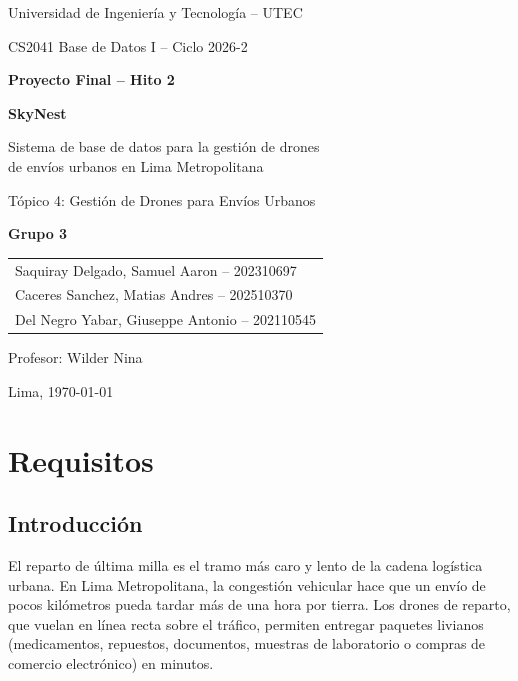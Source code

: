 \documentclass[11pt,a4paper]{article}
\begin{document}
\sloppy

\begin{titlepage}
\centering
{\large Universidad de Ingeniería y Tecnología -- UTEC\par}
\vspace{0.4cm}
{\large CS2041 Base de Datos I -- Ciclo 2026-2\par}
\vspace{2.5cm}
{\LARGE\bfseries Proyecto Final -- Hito 2\par}
\vspace{0.6cm}
{\Huge\bfseries SkyNest\par}
\vspace{0.3cm}
{\Large Sistema de base de datos para la gestión de drones\\ de envíos urbanos en Lima Metropolitana\par}
\vspace{0.6cm}
{\large Tópico 4: Gestión de Drones para Envíos Urbanos\par}
\vspace{2.5cm}
{\large\bfseries Grupo 3\par}
\vspace{0.3cm}
\begin{tabular}{l}
Saquiray Delgado, Samuel Aaron -- 202310697 \\
Caceres Sanchez, Matias Andres -- 202510370 \\
Del Negro Yabar, Giuseppe Antonio -- 202110545 \\
\end{tabular}
\vfill
{\large Profesor: Wilder Nina\par}
\vspace{0.3cm}
{\large Lima, \today\par}
\end{titlepage}

\tableofcontents
\newpage

\section{Requisitos}

\subsection{Introducción}
El reparto de última milla es el tramo más caro y lento de la cadena logística urbana. En Lima Metropolitana, la congestión vehicular hace que un envío de pocos kilómetros pueda tardar más de una hora por tierra. Los drones de reparto, que vuelan en línea recta sobre el tráfico, permiten entregar paquetes livianos (medicamentos, repuestos, documentos, muestras de laboratorio o compras de comercio electrónico) en minutos.
\end{document}
